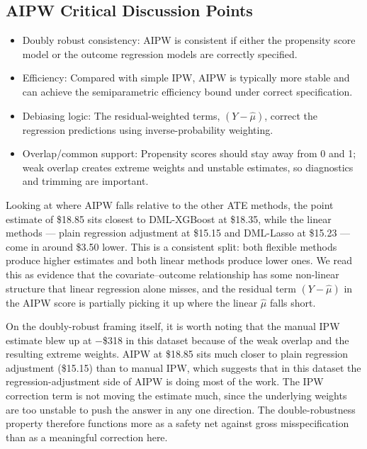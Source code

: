 \documentclass[
  letterpaper,
  DIV=11,
  numbers=noendperiod]{scrartcl}
\providecommand{\tightlist}{%
  \setlength{\itemsep}{0pt}\setlength{\parskip}{0pt}}
\begin{document}
\subsection{AIPW Critical Discussion
Points}\label{aipw-critical-discussion-points}

\begin{itemize}
\tightlist
\item
  Doubly robust consistency: AIPW is consistent if either the propensity
  score model or the outcome regression models are correctly specified.
\item
  Efficiency: Compared with simple IPW, AIPW is typically more stable
  and can achieve the semiparametric efficiency bound under correct
  specification.
\item
  Debiasing logic: The residual-weighted terms, \((Y - \hat{\mu})\),
  correct the regression predictions using inverse-probability
  weighting.
\item
  Overlap/common support: Propensity scores should stay away from 0 and
  1; weak overlap creates extreme weights and unstable estimates, so
  diagnostics and trimming are important.
\end{itemize}

Looking at where AIPW falls relative to the other ATE methods, the point
estimate of \$18.85 sits closest to DML-XGBoost at \$18.35, while the
linear methods --- plain regression adjustment at \$15.15 and DML-Lasso
at \$15.23 --- come in around \$3.50 lower. This is a consistent split:
both flexible methods produce higher estimates and both linear methods
produce lower ones. We read this as evidence that the covariate--outcome
relationship has some non-linear structure that linear regression alone
misses, and the residual term \((Y - \hat{\mu})\) in the AIPW score is
partially picking it up where the linear \(\hat{\mu}\) falls short.

On the doubly-robust framing itself, it is worth noting that the manual
IPW estimate blew up at −\$318 in this dataset because of the weak
overlap and the resulting extreme weights. AIPW at \$18.85 sits much
closer to plain regression adjustment (\$15.15) than to manual IPW,
which suggests that in this dataset the regression-adjustment side of
AIPW is doing most of the work. The IPW correction term is not moving
the estimate much, since the underlying weights are too unstable to push
the answer in any one direction. The double-robustness property
therefore functions more as a safety net against gross misspecification
than as a meaningful correction here.
\end{document}
